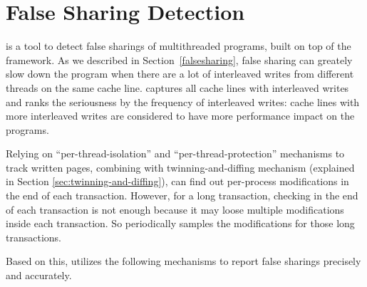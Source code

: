

\section{False Sharing Detection}
\SheriffDetect{} is a tool to detect false sharings of multithreaded programs, built on
top of the \sheriff{} framework. 
As we described in Section~\ref{falsesharing}, false sharing can greately slow down the program 
when there are a lot of interleaved writes from different threads on the same cache line.
\SheriffDetect{} captures all cache lines with interleaved writes and 
ranks the seriousness by the frequency 
of interleaved writes: cache lines with more interleaved writes are considered to have more 
performance impact on the programs.  

Relying on ``per-thread-isolation'' and ``per-thread-protection'' mechanisms to track written pages, 
combining with twinning-and-diffing mechanism (explained in Section \ref{sec:twinning-and-diffing}),
\SheriffDetect{} can find out per-process modifications in the end of each transaction.
However, for a long transaction, checking in the end of each transaction is not enough because it
may loose multiple modifications inside each transaction.
So \SheriffDetect{} periodically samples the modifications for those long transactions. 

Based on this, \SheriffDetect{} utilizes the following mechanisms to report false 
sharings precisely and accurately. 

